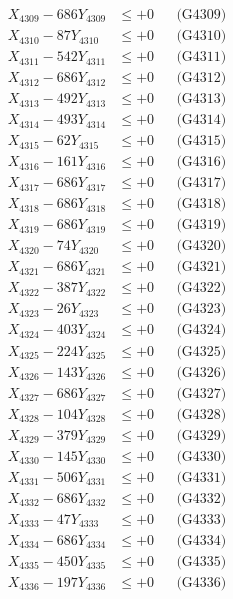 \documentclass[a4paper,10pt]{article}
\begin{document}
{\begin{align}
X_{4309} - 686Y_{4309} &\leq +0 && \text{(G4309)} \\
X_{4310} - 87Y_{4310} &\leq +0 && \text{(G4310)} \\
\allowbreak
X_{4311} - 542Y_{4311} &\leq +0 && \text{(G4311)} \\
X_{4312} - 686Y_{4312} &\leq +0 && \text{(G4312)} \\
X_{4313} - 492Y_{4313} &\leq +0 && \text{(G4313)} \\
X_{4314} - 493Y_{4314} &\leq +0 && \text{(G4314)} \\
X_{4315} - 62Y_{4315} &\leq +0 && \text{(G4315)} \\
X_{4316} - 161Y_{4316} &\leq +0 && \text{(G4316)} \\
X_{4317} - 686Y_{4317} &\leq +0 && \text{(G4317)} \\
X_{4318} - 686Y_{4318} &\leq +0 && \text{(G4318)} \\
X_{4319} - 686Y_{4319} &\leq +0 && \text{(G4319)} \\
X_{4320} - 74Y_{4320} &\leq +0 && \text{(G4320)} \\
\allowbreak
X_{4321} - 686Y_{4321} &\leq +0 && \text{(G4321)} \\
X_{4322} - 387Y_{4322} &\leq +0 && \text{(G4322)} \\
X_{4323} - 26Y_{4323} &\leq +0 && \text{(G4323)} \\
X_{4324} - 403Y_{4324} &\leq +0 && \text{(G4324)} \\
X_{4325} - 224Y_{4325} &\leq +0 && \text{(G4325)} \\
X_{4326} - 143Y_{4326} &\leq +0 && \text{(G4326)} \\
X_{4327} - 686Y_{4327} &\leq +0 && \text{(G4327)} \\
X_{4328} - 104Y_{4328} &\leq +0 && \text{(G4328)} \\
X_{4329} - 379Y_{4329} &\leq +0 && \text{(G4329)} \\
X_{4330} - 145Y_{4330} &\leq +0 && \text{(G4330)} \\
\allowbreak
X_{4331} - 506Y_{4331} &\leq +0 && \text{(G4331)} \\
X_{4332} - 686Y_{4332} &\leq +0 && \text{(G4332)} \\
X_{4333} - 47Y_{4333} &\leq +0 && \text{(G4333)} \\
X_{4334} - 686Y_{4334} &\leq +0 && \text{(G4334)} \\
X_{4335} - 450Y_{4335} &\leq +0 && \text{(G4335)} \\
X_{4336} - 197Y_{4336} &\leq +0 && \text{(G4336)} \\

\end{align}}
\end{document}
